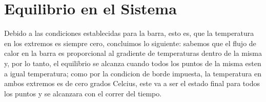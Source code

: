 \documentclass{article}
\begin{document}
\section{Equilibrio en el Sistema}
Debido a las condiciones establecidas para la barra, esto es, que la
temperatura en los extremos es siempre cero, concluimos lo siguiente:
sabemos que el flujo de calor en la barra es proporcional al gradiente de
temperaturas dentro de la misma y, por lo tanto, el equilibrio se
alcanza cuando todos los puntos de la misma esten a igual temperatura;
como por la condicion de borde impuesta, la temperatura en ambos
extremos es de cero grados Celcius, este va a ser el estado final para
todos los puntos y se alcanzara con el correr del tiempo.


\newpage
\begin{appendix}
  \listoffigures
\end{appendix}
\end{document}
